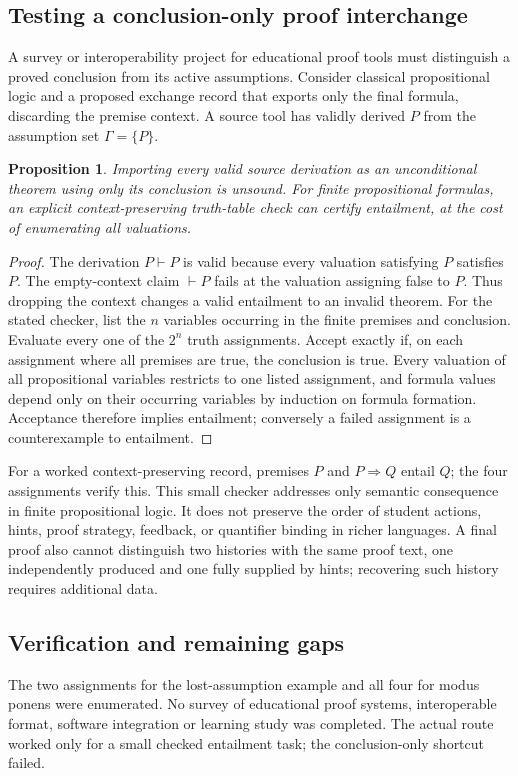 \documentclass[11pt]{article}
\newtheorem{proposition}{Proposition}
\begin{document}
\subsection{Testing a conclusion-only proof interchange}
A survey or interoperability project for educational proof tools must distinguish a proved conclusion from its active assumptions. Consider classical propositional logic and a proposed exchange record that exports only the final formula, discarding the premise context. A source tool has validly derived $P$ from the assumption set $\Gamma=\{P\}$.
\begin{proposition}
Importing every valid source derivation as an unconditional theorem using only its conclusion is unsound. For finite propositional formulas, an explicit context-preserving truth-table check can certify entailment, at the cost of enumerating all valuations.
\end{proposition}
\begin{proof}
The derivation $P\vdash P$ is valid because every valuation satisfying $P$ satisfies $P$. The empty-context claim $\vdash P$ fails at the valuation assigning false to $P$. Thus dropping the context changes a valid entailment to an invalid theorem. For the stated checker, list the $n$ variables occurring in the finite premises and conclusion. Evaluate every one of the $2^n$ truth assignments. Accept exactly if, on each assignment where all premises are true, the conclusion is true. Every valuation of all propositional variables restricts to one listed assignment, and formula values depend only on their occurring variables by induction on formula formation. Acceptance therefore implies entailment; conversely a failed assignment is a counterexample to entailment.
\end{proof}
For a worked context-preserving record, premises $P$ and $P\Rightarrow Q$ entail $Q$; the four assignments verify this. This small checker addresses only semantic consequence in finite propositional logic. It does not preserve the order of student actions, hints, proof strategy, feedback, or quantifier binding in richer languages. A final proof also cannot distinguish two histories with the same proof text, one independently produced and one fully supplied by hints; recovering such history requires additional data.
\subsection{Verification and remaining gaps}
The two assignments for the lost-assumption example and all four for modus ponens were enumerated. No survey of educational proof systems, interoperable format, software integration or learning study was completed. The actual route worked only for a small checked entailment task; the conclusion-only shortcut failed.
\end{document}
